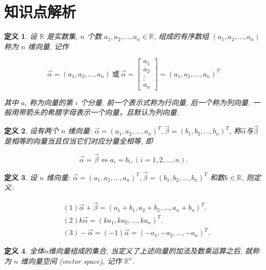 \documentclass[a4paper]{book}
\newtheorem{Def}{定义}[chapter]
\begin{document}
\section{知识点解析}
\begin{Def}
设 $\mathbb{R}$ 是实数集, $n$ 个数 $a_1, a_2 ,\dots, a_n \in\mathbb{R}$,  组成的有序数组 $(a_1, a_2 ,\dots, a_n)$ 称为 $n$ 维向量,  记作

\begin{displaymath}
\vec{\alpha}=(a_1,a_2,\dots,a_n) \ \mbox{或}\ \vec{\alpha}=\begin{bmatrix}a_1\\a_2\\ \vdots \\ a_n\end{bmatrix}=(a_1,a_2,\dots,a_n)^T
\end{displaymath}

其中 $a_i$ 称为向量的第 $i$ 个分量.  前一个表示式称为行向量,  后一个称为列向量.  一般用带箭头的希腊字母表示一个向量，且默认为列向量.

\end{Def}

\begin{Def}
设有两个 $n$ 维向量: $\vec{\alpha}=(a_1,a_2,\dots,a_n)^T, \vec{\beta}=(b_1,b_2,\dots,b_n)^T$, 称$\vec{\alpha}$与$\vec{\beta}$是相等的向量当且仅当它们对应分量全相等, 即

\begin{displaymath}
\vec{\alpha}=\vec{\beta}\Leftrightarrow a_i=b_i, (i=1,2,\dots,n).
\end{displaymath}

\end{Def}

\begin{Def}
设 $n$ 维向量: $\vec{\alpha}=(a_1,a_2,\dots,a_n)^T, \vec{\beta}=(b_1,b_2,\dots,b_n)^T$ 和数$k\in\mathbb{R}$, 则定义:

\begin{displaymath}\begin{aligned}
&(1)\vec{\alpha}+\vec{\beta}=(a_1+b_1,a_2+b_2,\dots,a_n+b_n)^T.\\
&(2)k\vec{\alpha}=(ka_1,ka_2,\dots,ka_n)^T.\\
&(3)-\vec{\alpha}=(-1)\vec{\alpha}=(-a_1,-a_2,\dots,-a_n)^T.
\end{aligned}\end{displaymath}
\end{Def}

\begin{Def}
全体$n$维向量组成的集合, 当定义了上述向量的加法及数乘运算之后, 就称为 $n$ 维向量空间 (vector space), 记作 $\mathbb{R}^n$.

\end{Def}
\end{document}
